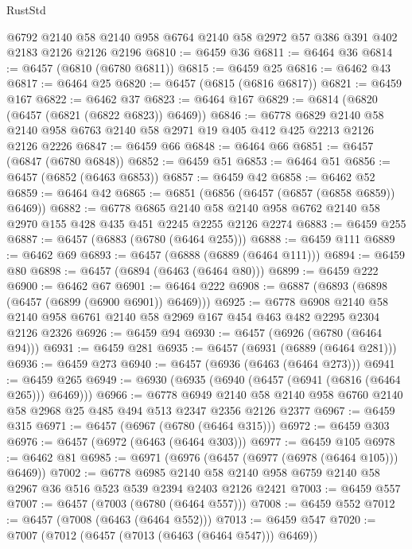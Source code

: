 \begin{lexlean}{RustStd}
\begin{coremodule}
    @6792
    @2140
    @58
    @2140
    @958
    @6764
    @2140
    @58
    @2972
    @57
    @386
    @391
    @402
    @2183
    @2126
    @2126
    @2196
@6810 := @6459 @36
@6811 := @6464 @36
@6814 := @6457 (@6810 (@6780 @6811))
@6815 := @6459 @25
@6816 := @6462 @43
@6817 := @6464 @25
@6820 := @6457 (@6815 (@6816 @6817))
@6821 := @6459 @167
@6822 := @6462 @37
@6823 := @6464 @167
@6829 := @6814 (@6820 (@6457 (@6821 (@6822 @6823)) @6469))
@6846 := @6778
    @6829
    @2140
    @58
    @2140
    @958
    @6763
    @2140
    @58
    @2971
    @19
    @405
    @412
    @425
    @2213
    @2126
    @2126
    @2226
@6847 := @6459 @66
@6848 := @6464 @66
@6851 := @6457 (@6847 (@6780 @6848))
@6852 := @6459 @51
@6853 := @6464 @51
@6856 := @6457 (@6852 (@6463 @6853))
@6857 := @6459 @42
@6858 := @6462 @52
@6859 := @6464 @42
@6865 := @6851 (@6856 (@6457 (@6857 (@6858 @6859)) @6469))
@6882 := @6778
    @6865
    @2140
    @58
    @2140
    @958
    @6762
    @2140
    @58
    @2970
    @155
    @428
    @435
    @451
    @2245
    @2255
    @2126
    @2274
@6883 := @6459 @255
@6887 := @6457 (@6883 (@6780 (@6464 @255)))
@6888 := @6459 @111
@6889 := @6462 @69
@6893 := @6457 (@6888 (@6889 (@6464 @111)))
@6894 := @6459 @80
@6898 := @6457 (@6894 (@6463 (@6464 @80)))
@6899 := @6459 @222
@6900 := @6462 @67
@6901 := @6464 @222
@6908 := @6887 (@6893 (@6898 (@6457 (@6899 (@6900 @6901)) @6469)))
@6925 := @6778
    @6908
    @2140
    @58
    @2140
    @958
    @6761
    @2140
    @58
    @2969
    @167
    @454
    @463
    @482
    @2295
    @2304
    @2126
    @2326
@6926 := @6459 @94
@6930 := @6457 (@6926 (@6780 (@6464 @94)))
@6931 := @6459 @281
@6935 := @6457 (@6931 (@6889 (@6464 @281)))
@6936 := @6459 @273
@6940 := @6457 (@6936 (@6463 (@6464 @273)))
@6941 := @6459 @265
@6949 := @6930 (@6935 (@6940 (@6457 (@6941 (@6816 (@6464 @265))) @6469)))
@6966 := @6778
    @6949
    @2140
    @58
    @2140
    @958
    @6760
    @2140
    @58
    @2968
    @25
    @485
    @494
    @513
    @2347
    @2356
    @2126
    @2377
@6967 := @6459 @315
@6971 := @6457 (@6967 (@6780 (@6464 @315)))
@6972 := @6459 @303
@6976 := @6457 (@6972 (@6463 (@6464 @303)))
@6977 := @6459 @105
@6978 := @6462 @81
@6985 := @6971 (@6976 (@6457 (@6977 (@6978 (@6464 @105))) @6469))
@7002 := @6778
    @6985
    @2140
    @58
    @2140
    @958
    @6759
    @2140
    @58
    @2967
    @36
    @516
    @523
    @539
    @2394
    @2403
    @2126
    @2421
@7003 := @6459 @557
@7007 := @6457 (@7003 (@6780 (@6464 @557)))
@7008 := @6459 @552
@7012 := @6457 (@7008 (@6463 (@6464 @552)))
@7013 := @6459 @547
@7020 := @7007 (@7012 (@6457 (@7013 (@6463 (@6464 @547))) @6469))

\end{coremodule}
\end{lexlean}

